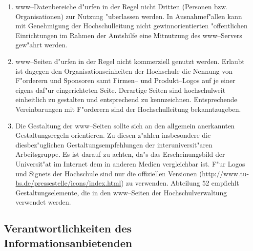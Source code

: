 \begin{enumerate}
  \item www--Datenbereiche d"urfen in der Regel nicht Dritten (Personen
        bzw. Organisationen) zur Nutzung "uberlassen werden. In
        Ausnahmef"allen kann mit Genehmigung der Hochschulleitung
        nicht gewinnorientierten "offentlichen Einrichtungen im
        Rahmen der Amtshilfe eine Mitnutzung des www--Servers gew"ahrt
        werden.

  \item www--Seiten d"urfen in der Regel nicht kommerziell genutzt
        werden. Erlaubt ist dagegen den Organisationseinheiten der
        Hochschule die Nennung von F"orderern und Sponsoren samt
        Firmen-- und Produkt--Logos auf je einer eigens daf"ur
        eingerichteten Seite. Derartige Seiten sind hochschulweit
        einheitlich zu gestalten und entsprechend zu kennzeichnen.
        Entsprechende Vereinbarungen mit F"orderern sind der
        Hochschulleitung bekanntzugeben.

  \item Die Gestaltung der www--Seiten sollte sich an den allgemein
        anerkannten Gestaltungsregeln orientieren. Zu diesen
        z"ahlen insbesondere die diesbez"uglichen Gestaltungsempfehlungen
        der interuniversit"aren Arbeitsgruppe. Es ist darauf zu
        achten, da"s das Erscheinungsbild der Universit"at
        im Internet dem in anderen Medien vergleichbar ist. F"ur
        Logos und Signets der Hochschule sind nur die offiziellen
        Versionen (\url{http://www.tu-bs.de/pressestelle/icons/index.html})
        zu verwenden. Abteilung 52 empfiehlt Gestaltungselemente,
        die in den www--Seiten der Hochschulverwaltung verwendet werden.
\end{enumerate}

\subsection{Verantwortlichkeiten des Informationsanbietenden}

